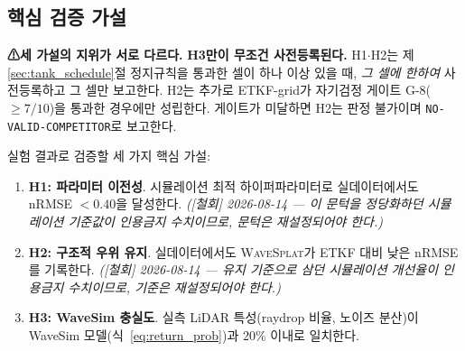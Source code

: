 \documentclass[11pt]{report}
\numberwithin{equation}{chapter}
\numberwithin{figure}{chapter}
\numberwithin{table}{chapter}
\newcommand{\WS}{\textsc{WaveSplat}}
\begin{document}
\subsection{핵심 검증 가설}

\textbf{⚠세 가설의 지위가 서로 다르다.} \textbf{H3만이 무조건 사전등록된다.}
H1$\cdot$H2는 제\ref{sec:tank_schedule}절 정지규칙을 통과한 셀이 하나 이상 있을 때,
\emph{그 셀에 한하여} 사전등록하고 그 셀만 보고한다.
H2는 추가로 ETKF-grid가 자기검정 게이트 G-8($\ge 7/10$)을 통과한 경우에만 성립한다.
게이트가 미달하면 H2는 판정 불가이며 \texttt{NO-VALID-COMPETITOR}로 보고한다.

실험 결과로 검증할 세 가지 핵심 가설:

\begin{enumerate}
  \item \textbf{H1: 파라미터 이전성}. 시뮬레이션 최적 하이퍼파라미터로
        실데이터에서도 nRMSE $< 0.40$을 달성한다.
        \emph{([철회] 2026-08-14 --- 이 문턱을 정당화하던 시뮬레이션 기준값이
        인용금지 수치이므로, 문턱은 재설정되어야 한다.)}
  \item \textbf{H2: 구조적 우위 유지}. 실데이터에서도 \WS{}가 ETKF 대비
        낮은 nRMSE를 기록한다.
        \emph{([철회] 2026-08-14 --- 유지 기준으로 삼던 시뮬레이션 개선율이
        인용금지 수치이므로, 기준은 재설정되어야 한다.)}
  \item \textbf{H3: WaveSim 충실도}. 실측 LiDAR 특성(raydrop 비율, 노이즈 분산)이
        WaveSim 모델(식~\ref{eq:return_prob})과 20\% 이내로 일치한다.
\end{enumerate}
\end{document}
